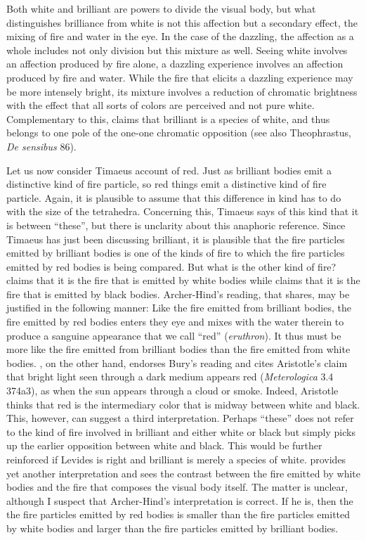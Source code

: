 Both white and brilliant are powers to divide the visual body, but what distinguishes brilliance from white is not this affection but a secondary effect, the mixing of fire and water in the eye. In the case of the dazzling, the affection as a whole includes not only division but this mixture as well. Seeing white involves an affection produced by fire alone, a dazzling experience involves an affection produced by fire and water. While the fire that elicits a dazzling experience may be more intensely bright, its mixture involves a reduction of chromatic brightness with the effect that all sorts of colors are perceived and not pure white. Complementary to this, \citet[10--1]{Levides:2002aa} claims that brilliant is a species of white, and thus belongs to one pole of the one-one chromatic opposition (see also Theophrastus, \emph{De sensibus} 86).

Let us now consider Timaeus account of red. Just as brilliant bodies emit a distinctive kind of fire particle, so red things emit a distinctive kind of fire particle. Again, it is plausible to assume that this difference in kind has to do with the size of the tetrahedra. Concerning this, Timaeus says of this kind that it is between ``these'', but there is unclarity about this anaphoric reference. Since Timaeus has just been discussing brilliant, it is plausible that the fire particles emitted by brilliant bodies is one of the kinds of fire to which the fire particles emitted by red bodies is being compared. But what is the other kind of fire? \citet[250 n8]{Archer-Hind:1888qd} claims that it is the fire that is emitted by white bodies while \citet[67 n3]{Bury:1929jb} claims that it is the fire that is emitted by black bodies. Archer-Hind's reading, that \citet[168]{Brisson:1997qr} shares, may be justified in the following manner: Like the fire emitted from brilliant bodies, the fire emitted by red bodies enters they eye and mixes with the water therein to produce a sanguine appearance that we call ``red'' (\emph{eruthron}). It thus must be more like the fire emitted from brilliant bodies than the fire emitted from white bodies. \citet[277 n2]{Cornford:1935fk}, on the other hand, endorses Bury's reading and cites Aristotle's claim that bright light seen through a dark medium appears red (\emph{Meterologica} 3.4 374a3), as when the sun appears through a cloud or smoke. Indeed, Aristotle thinks that red is the intermediary color that is midway between white and black. This, however, can suggest a third interpretation. Perhaps ``these'' does not refer to the kind of fire involved in brilliant and either white or black but simply picks up the earlier opposition between white and black. This would be further reinforced if Levides is right and brilliant is merely a species of white. \citet[482]{Taylor:1928qb} provides yet another interpretation and sees the contrast between the fire emitted by white bodies and the fire that composes the visual body itself. The matter is unclear, although I suspect that Archer-Hind's interpretation is correct. If he is, then the the fire particles emitted by red bodies is smaller than the fire particles emitted by white bodies and larger than the fire particles emitted by brilliant bodies.

